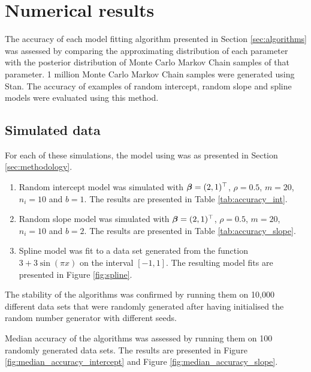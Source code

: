 \documentclass{article}[12pt]
\begin{document}

\section{Numerical results}
\label{sec:results}

The accuracy of each model fitting algorithm presented in Section \ref{sec:algorithms} was assessed by
comparing the approximating distribution of each parameter with the posterior distribution of Monte Carlo
Markov Chain samples of that parameter. 1 million Monte Carlo Markov Chain samples were generated using Stan.
The accuracy of examples of random intercept, random slope and spline models were evaluated using this method.

\subsection{Simulated data}

For each of these simulations, the model using was as presented in Section \ref{sec:methodology}.

\begin{enumerate}
\item Random intercept model was simulated with ${\boldsymbol \beta} = (2, 1)^\top$, $\rho = 0.5$, $m = 20$, $n_i = 10$ and
$b = 1$. The results are presented in Table \ref{tab:accuracy_int}.
\item Random slope model was simulated with ${\boldsymbol \beta} = (2, 1)^\top$, $\rho = 0.5$, $m = 20$, $n_i = 10$ and $b
= 2$. The results are presented in Table \ref{tab:accuracy_slope}.
\item Spline model was fit to a data set generated from the function $3 + 3 \sin{(\pi x)}$ on the interval
$[-1, 1]$. The resulting model fits are presented in Figure \ref{fig:spline}.
\end{enumerate}

The stability of the algorithms was confirmed by running them on 10,000 different data sets that were randomly
generated after having initialised the random number generator with different seeds.

Median accuracy of the algorithms was assessed by running them on 100 randomly generated data sets. The
results are presented in Figure \ref{fig:median_accuracy_intercept} and Figure
\ref{fig:median_accuracy_slope}.
\end{document}
